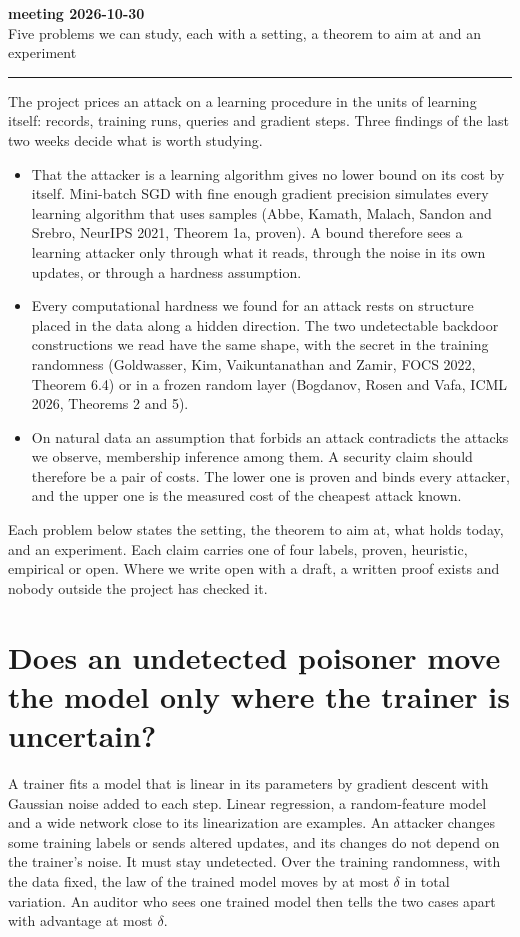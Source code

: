 \documentclass[10pt,a4paper]{article}
\newcommand{\redline}{\textcolor{kred}{\rule{\textwidth}{1pt}}}
\begin{document}
\thispagestyle{fancy}

{\LARGE\bfseries\textcolor{kred}{meeting 2026-10-30}}\\[0.3em]
{\large Five problems we can study, each with a setting, a theorem to aim at and an experiment}\\[0.2em]
\redline

The project prices an attack on a learning procedure in the units of learning itself: records, training runs, queries and gradient steps. Three findings of the last two weeks decide what is worth studying.

\begin{itemize}
\item That the attacker is a learning algorithm gives no lower bound on its cost by itself. Mini-batch SGD with fine enough gradient precision simulates every learning algorithm that uses samples (Abbe, Kamath, Malach, Sandon and Srebro, NeurIPS 2021, Theorem 1a, proven). A bound therefore sees a learning attacker only through what it reads, through the noise in its own updates, or through a hardness assumption.
\item Every computational hardness we found for an attack rests on structure placed in the data along a hidden direction. The two undetectable backdoor constructions we read have the same shape, with the secret in the training randomness (Goldwasser, Kim, Vaikuntanathan and Zamir, FOCS 2022, Theorem 6.4) or in a frozen random layer (Bogdanov, Rosen and Vafa, ICML 2026, Theorems 2 and 5).
\item On natural data an assumption that forbids an attack contradicts the attacks we observe, membership inference among them. A security claim should therefore be a pair of costs. The lower one is proven and binds every attacker, and the upper one is the measured cost of the cheapest attack known.
\end{itemize}

Each problem below states the setting, the theorem to aim at, what holds today, and an experiment. Each claim carries one of four labels, proven, heuristic, empirical or open. Where we write open with a draft, a written proof exists and nobody outside the project has checked it.

\section{Does an undetected poisoner move the model only where the trainer is uncertain?}

A trainer fits a model that is linear in its parameters by gradient descent with Gaussian noise added to each step. Linear regression, a random-feature model and a wide network close to its linearization are examples. An attacker changes some training labels or sends altered updates, and its changes do not depend on the trainer's noise. It must stay undetected. Over the training randomness, with the data fixed, the law of the trained model moves by at most $\delta$ in total variation. An auditor who sees one trained model then tells the two cases apart with advantage at most $\delta$.
\end{document}
